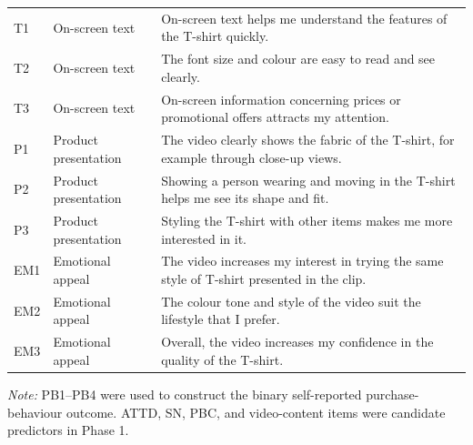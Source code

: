 \documentclass[10pt,a4paper]{article}
\begin{document}
\begin{longtable}{@{}L{0.10\textwidth}L{0.24\textwidth}L{0.58\textwidth}@{}}
\addlinespace[2pt]
T1 & On-screen text & On-screen text helps me understand the features of the T-shirt quickly. \\
T2 & On-screen text & The font size and colour are easy to read and see clearly. \\
T3 & On-screen text & On-screen information concerning prices or promotional offers attracts my attention. \\
\addlinespace[2pt]
P1 & Product presentation & The video clearly shows the fabric of the T-shirt, for example through close-up views. \\
P2 & Product presentation & Showing a person wearing and moving in the T-shirt helps me see its shape and fit. \\
P3 & Product presentation & Styling the T-shirt with other items makes me more interested in it. \\
\addlinespace[2pt]
EM1 & Emotional appeal & The video increases my interest in trying the same style of T-shirt presented in the clip. \\
EM2 & Emotional appeal & The colour tone and style of the video suit the lifestyle that I prefer. \\
EM3 & Emotional appeal & Overall, the video increases my confidence in the quality of the T-shirt. \\
\end{longtable}
\noindent\textit{Note:} PB1--PB4 were used to construct the binary self-reported purchase-behaviour outcome. ATTD, SN, PBC, and video-content items were candidate predictors in Phase 1.\par

\vspace{10pt} 
\end{document}
